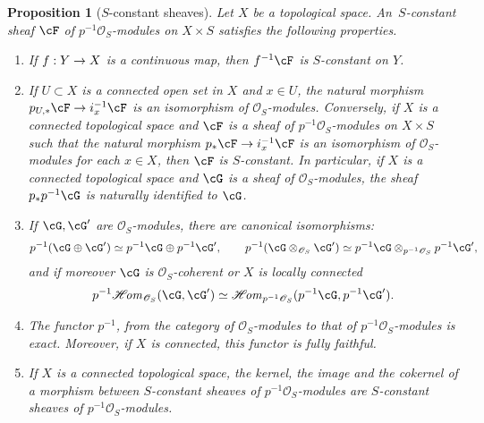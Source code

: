 \documentclass[english]{smfart}
\numberwithin{subsection}{section}
\def\sho{\mathcal{O}}\let\cO\sho
\newcommand{\shhom}{\mathcal{H}\!\mathit{om}}\let\ho\shhom
\newcommand{\XS}{X\times S}
\DeclareMathOperator{\id}{Id}\let\Id\id
\let\wt\widetilde
\def\cf{cf.\kern.3em}
\newcommand{\pOS}{p^{-1}\sho_S}
\numberwithin{equation}{section}
\theoremstyle{plain}
\newtheorem{proposition}[equation]{Proposition}
\theoremstyle{definition}
\def\to{\mathchoice{\longrightarrow}{\rightarrow}{\rightarrow}{\rightarrow}}
\begin{document}
\begin{comment}
Recall (\cf \cite[p.\,110]{Godement64}) that giving a sheaf $\cF$ on a topological space $Z$ is equivalent to giving a sheaf space $\mu:\wt\cF\to Z$, where $\mu$ is a local homeomorphism. The sheaf space $\wt{p^{-1}\cG}$ is nothing but the product $\id_X\times\mu:X\times\wt \cG\to \XS$. This interpretation is useful for the next proposition.
\end{comment}

\begin{proposition}[$S$-constant sheaves] \label{sor}
Let $X$ be a topological space. An~$S$\nobreakdash-constant sheaf $\cF$ of $\pOS$-modules on $\XS$ satisfies the following properties.
\begin{enumerate}
\item\label{sor1}
If $f:Y\to X$ is a continuous map, then $f^{-1}\cF$ is $S$-constant on $Y$.
\item\label{sor2}
If $U\subset X$ is a \emph{connected} open set in $X$ and $x\in U$, the natural morphism $p_{U,*}\cF\to i_x^{-1}\cF$ is an isomorphism of $\sho_S$-modules. Conversely, if $X$ is a connected topological space and $\cF$ is a sheaf of $\pOS$-modules on $\XS$ such that the natural morphism $p_*\cF\to i_x^{-1}\cF$ is an isomorphism of $\sho_S$-modules for each $x\in X$, then $\cF$ is $S$-constant. In particular, if $X$ is a connected topological space and $\cG$ is a sheaf of $\sho_S$-modules, the sheaf $p_*p^{-1}\cG$ is naturally identified to $\cG$.
\item\label{sor3}
If $\cG,\cG'$ are $\sho_S$-modules, there are canonical isomorphisms:
$$
p^{-1}(\cG\oplus\cG')\simeq p^{-1}\cG\oplus p^{-1}\cG' ,\qquad p^{-1}(\cG\otimes_{\sho_S}\cG')\simeq p^{-1}\cG\otimes_{\pOS} p^{-1}\cG',
$$
and if moreover $\cG$ is $\sho_S$-coherent or $X$ is \emph{locally connected}
$$
p^{-1}\shhom_{\sho_S}(\cG,\cG')\simeq\shhom_{\pOS}(p^{-1}\cG,p^{-1}\cG').
$$
\item\label{sor4}
The functor $p^{-1}$, from the category of $\sho_S$-modules to that of $\pOS$-modules is exact. Moreover, if $X$ is connected, this functor is fully faithful.
\item\label{sor5}
If $X$ is a connected topological space, the kernel, the image and the cokernel of a morphism between $S$-constant sheaves of $\pOS$-modules are $S$-constant sheaves of $\pOS$-modules.
\end{enumerate}
\end{proposition}
\end{document}
